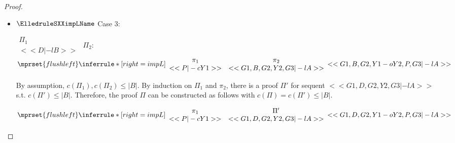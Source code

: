 \begin{proof}
\begin{enumerate}
\begin{itemize}
  \item $\ElledruleSXXimpLName$ Case 3:
      \begin{center}
        \scriptsize
        \begin{math}
          \begin{array}{c}
            \Pi_1 \\
            {<<D |-l B>>}
          \end{array}
        \end{math}
        \qquad\qquad
        $\Pi_2$:
        \begin{math}
          $$\mprset{flushleft}
          \inferrule* [right={\tiny impL}] {
            {
              \begin{array}{cc}
                \pi_1 & \pi_2 \\
                {<<P |-c Y1>>} & {<<G1, B, G2, Y2, G3 |-l A>>}
              \end{array}
            }
          }{<<G1, B, G2, Y1 -o Y2, P, G3 |-l A>>}
        \end{math}
      \end{center}
      By assumption, $c(\Pi_1),c(\Pi_2)\leq |B|$. By induction on $\Pi_1$ and $\pi_2$, there is
      a proof $\Pi'$ for sequent $<<G1, D, G2, Y2, G3 |-l A>>$ s.t. $c(\Pi') \leq |B|$.
      Therefore, the proof $\Pi$ can be constructed as follows with
      $c(\Pi) = c(\Pi') \leq |B|$.
      \begin{center}
        \scriptsize
        \begin{math}
          $$\mprset{flushleft}
          \inferrule* [right={\tiny impL}] {
            {
              \begin{array}{cc}
                \pi_1 & \Pi' \\
                {<<P |-c Y1>>} & {<<G1, D, G2, Y2, G3 |-l A>>}
              \end{array}
            }
          }{<<G1, D, G2, Y1 -o Y2, P, G3 |-l A>>}
        \end{math}
      \end{center}


\end{itemize}
\end{enumerate}
\end{proof}
